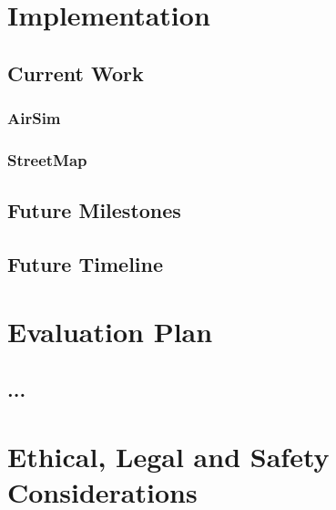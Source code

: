 \documentclass[11pt,oneside]{report}
\begin{document}
\chapter{Implementation}
\section{Current Work}
\subsection{AirSim}
\subsection{StreetMap}
\section{Future Milestones}
\section{Future Timeline}


\chapter{Evaluation Plan}
\section{...}

\chapter{Ethical, Legal and Safety Considerations}



\newpage
\nocite{*}

\end{document}
